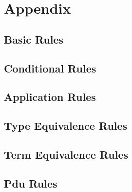 \section{Appendix}

\subsection{Basic Rules}


\subsection{Conditional Rules}


\subsection{Application Rules}


\subsection{Type Equivalence Rules}


\subsection{Term Equivalence Rules}


\subsection{Pdu Rules}


